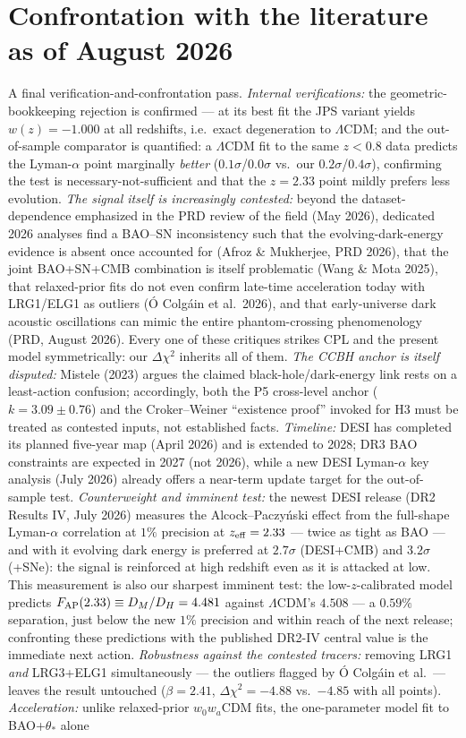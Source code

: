 \documentclass[11pt]{article}
\begin{document}
\section{Confrontation with the literature as of August 2026}
A final verification-and-confrontation pass. \emph{Internal verifications:} the geometric-bookkeeping rejection is confirmed --- at its best fit the JPS variant yields $w(z) = -1.000$ at all redshifts, i.e.\ exact degeneration to $\Lambda$CDM; and the out-of-sample comparator is quantified: a $\Lambda$CDM fit to the same $z<0.8$ data predicts the Lyman-$\alpha$ point marginally \emph{better} ($0.1\sigma$/$0.0\sigma$ vs.\ our $0.2\sigma$/$0.4\sigma$), confirming the test is necessary-not-sufficient and that the $z=2.33$ point mildly prefers less evolution. \emph{The signal itself is increasingly contested:} beyond the dataset-dependence emphasized in the PRD review of the field (May 2026), dedicated 2026 analyses find a BAO--SN inconsistency such that the evolving-dark-energy evidence is absent once accounted for (Afroz \& Mukherjee, PRD 2026), that the joint BAO+SN+CMB combination is itself problematic (Wang \& Mota 2025), that relaxed-prior fits do not even confirm late-time acceleration today with LRG1/ELG1 as outliers (\'O Colg\'ain et al.\ 2026), and that early-universe dark acoustic oscillations can mimic the entire phantom-crossing phenomenology (PRD, August 2026). Every one of these critiques strikes CPL and the present model symmetrically: our $\Delta\chi^2$ inherits all of them. \emph{The CCBH anchor is itself disputed:} Mistele (2023) argues the claimed black-hole/dark-energy link rests on a least-action confusion; accordingly, both the P5 cross-level anchor ($k = 3.09 \pm 0.76$) and the Croker--Weiner ``existence proof'' invoked for H3 must be treated as contested inputs, not established facts. \emph{Timeline:} DESI has completed its planned five-year map (April 2026) and is extended to 2028; DR3 BAO constraints are expected in 2027 (not 2026), while a new DESI Lyman-$\alpha$ key analysis (July 2026) already offers a near-term update target for the out-of-sample test. \emph{Counterweight and imminent test:} the newest DESI release (DR2 Results IV, July 2026) measures the Alcock--Paczy\'nski effect from the full-shape Lyman-$\alpha$ correlation at $1\%$ precision at $z_{\rm eff} = 2.33$ --- twice as tight as BAO --- and with it evolving dark energy is preferred at $2.7\sigma$ (DESI+CMB) and $3.2\sigma$ (+SNe): the signal is reinforced at high redshift even as it is attacked at low. This measurement is also our sharpest imminent test: the low-$z$-calibrated model predicts $F_{\rm AP}(2.33) \equiv D_M/D_H = 4.481$ against $\Lambda$CDM's $4.508$ --- a $0.59\%$ separation, just below the new $1\%$ precision and within reach of the next release; confronting these predictions with the published DR2-IV central value is the immediate next action. \emph{Robustness against the contested tracers:} removing LRG1 \emph{and} LRG3+ELG1 simultaneously --- the outliers flagged by \'O Colg\'ain et al.\ --- leaves the result untouched ($\beta = 2.41$, $\Delta\chi^2 = -4.88$ vs.\ $-4.85$ with all points). \emph{Acceleration:} unlike relaxed-prior $w_0w_a$CDM fits, the one-parameter model fit to BAO+$\theta_*$ alone 
\end{document}

